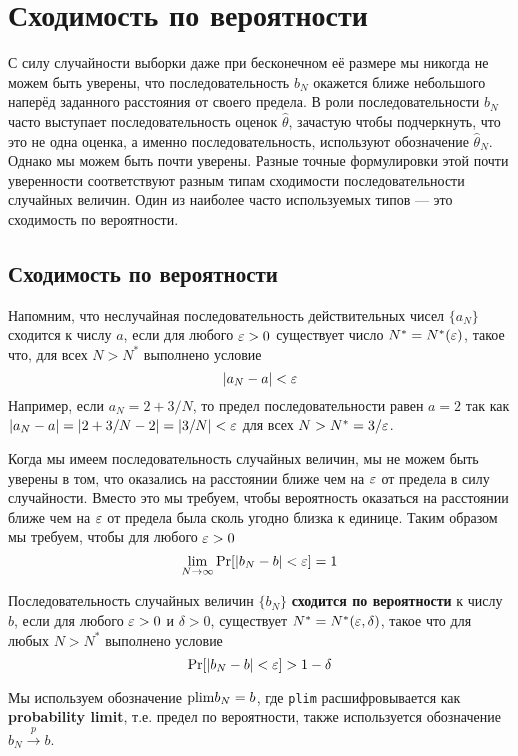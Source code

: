 \section{Сходимость по вероятности}

С силу случайности выборки даже при бесконечном её размере мы никогда не можем быть уверены, что последовательность $b_N$ окажется ближе небольшого наперёд заданного расстояния от своего предела. В роли последовательности $b_N$ часто выступает последовательность оценок $\hat{\theta}$, зачастую чтобы подчеркнуть, что это не одна оценка, а именно последовательность, используют обозначение $\hat{\theta}_N$. Однако мы можем быть почти уверены. Разные точные формулировки этой почти уверенности соответствуют разным типам сходимости последовательности случайных величин. Один из наиболее часто используемых типов --- это сходимость по вероятности.

\subsection{Сходимость по вероятности}

Напомним, что неслучайная последовательность действительных чисел $\{a_N\}$ сходится к числу $a$, если для любого $\varepsilon>0$ существует число $N^*=N^*(\varepsilon)$, такое что, для всех $N>N^*$ выполнено условие
\[
|a_N-a|<\varepsilon
\]
Например, если $a_N=2+3/N$, то предел последовательности равен $a=2$ так как $|a_N-a|=|2+3/N-2|=|3/N|<\varepsilon$ для всех $N>N^*=3/\varepsilon$.

Когда мы имеем последовательность случайных величин, мы не можем быть уверены в том, что оказались на расстоянии ближе чем на $\varepsilon$ от предела в силу случайности. Вместо это мы требуем, чтобы вероятность оказаться на расстоянии ближе чем на $\varepsilon$ от предела была сколь угодно близка к единице. Таким образом мы требуем, чтобы для любого $\varepsilon > 0$
\[
\lim_{N\to\infty} \mathrm{Pr}[|b_N-b|<\varepsilon]=1
\]

\begin{definition} Последовательность случайных величин $\{b_N\}$ \textbf{сходится по вероятности} к числу $b$, если для любого $\varepsilon>0$ и $\delta>0$, существует $N^*=N^*(\varepsilon,\delta)$, такое что для любых $N>N^*$ выполнено условие
\label{def:A1}
\begin{equation}
\mathrm{Pr}[|b_N-b|<\varepsilon]>1-\delta
\end{equation}
\end{definition}

Мы используем обозначение $\mathrm{plim } b_N=b$, где \verb|plim| расшифровывается как \textbf{probability limit}, т.е. предел по вероятности, также используется обозначение $b_N \overset{p}{\to}b$.

